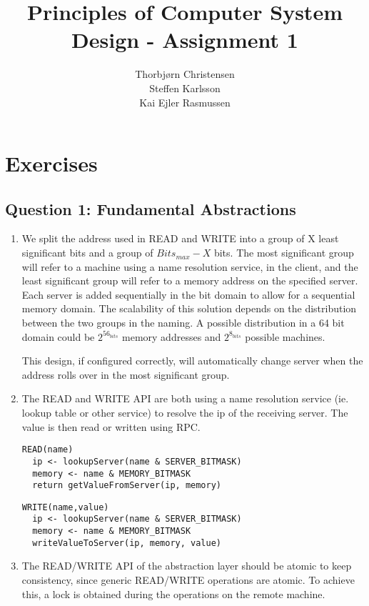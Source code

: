 \documentclass[10pt,a4paper]{article}
\author{Thorbjørn Christensen \\
Steffen Karlsson \\
Kai Ejler Rasmussen}
\title{Principles of Computer System Design - Assignment 1}
\begin{document}
\maketitle

\section*{Exercises}
\subsection*{Question 1: Fundamental Abstractions}
\begin{enumerate}
	\item 
	We split the address used in READ and WRITE into a group of X least significant bits and a group of $Bits_{max}-X$ bits. The most significant group will refer to a machine using a name resolution service, in the client, and the least significant group will refer to a memory address on the specified server. Each server is added sequentially in the bit domain to allow for a sequential memory domain. The scalability of this solution depends on the distribution between the two groups in the naming. A possible distribution in a 64 bit domain could be $2^{56_{bits}}$ memory addresses and $2^{8_{bits}}$ possible machines. 
	
	This design, if configured correctly, will automatically change server when the address rolls over in the most significant group.
	
	
	\item The READ and WRITE API are both using a name resolution service (ie. lookup table or other service) to resolve the ip of the receiving server. The value is then read or written using RPC.
	\\
\begin{lstlisting}
READ(name)
  ip <- lookupServer(name & SERVER_BITMASK)
  memory <- name & MEMORY_BITMASK
  return getValueFromServer(ip, memory)
\end{lstlisting}	

\begin{lstlisting}
WRITE(name,value)
  ip <- lookupServer(name & SERVER_BITMASK)
  memory <- name & MEMORY_BITMASK
  writeValueToServer(ip, memory, value)
\end{lstlisting}
	
	\item The READ/WRITE API of the abstraction layer should be atomic to keep consistency, since generic READ/WRITE operations are atomic. To achieve this, a lock is obtained during the operations on the remote machine.
	

\end{enumerate}
\end{document}

